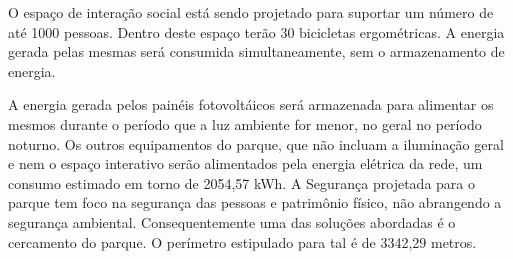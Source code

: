 	O espaço de interação social está sendo projetado para suportar um número de até 1000 pessoas. Dentro deste espaço terão 30 bicicletas ergométricas. A energia gerada pelas mesmas será consumida simultaneamente, sem o armazenamento de energia. 
	
	A energia gerada pelos painéis fotovoltáicos será armazenada para alimentar os mesmos durante o período que a luz ambiente for menor, no geral no período noturno. Os outros equipamentos do parque, que não incluam a iluminação geral e nem o espaço interativo serão alimentados pela energia elétrica da rede, um consumo estimado em torno de  2054,57 kWh. A Segurança projetada para o parque tem foco na segurança das pessoas e patrimônio físico, não abrangendo a segurança ambiental. Consequentemente uma das soluções abordadas é o cercamento do parque. O perímetro estipulado para tal é de 3342,29 metros. 